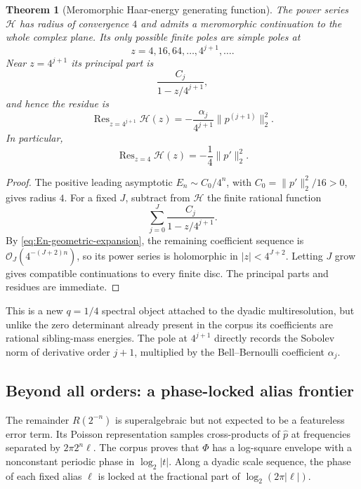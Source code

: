 \documentclass[11pt,oneside]{article}
\newtheorem{theorem}{Theorem}[section]
\theoremstyle{definition}
\theoremstyle{remark}
\newcommand{\Res}{\operatorname{Res}}
\newcommand{\bigO}{\mathcal O}
\begin{document}
\begin{theorem}[Meromorphic Haar-energy generating function]
\label{thm:H-meromorphic}
The power series $\mathcal H$ has radius of convergence $4$ and admits a
meromorphic continuation to the whole complex plane.  Its only possible finite
poles are simple poles at
\begin{equation}\label{eq:H-poles}
 z=4,16,64,\ldots,4^{j+1},\ldots.
\end{equation}
Near $z=4^{j+1}$ its principal part is
\begin{equation}\label{eq:H-principal-part}
 \frac{C_j}{1-z/4^{j+1}},
\end{equation}
and hence the residue is
\begin{equation}\label{eq:H-residue}
 \Res_{z=4^{j+1}}\mathcal H(z)
 =-\frac{\alpha_j}{4^{j+1}}\|p^{(j+1)}\|_2^2.
\end{equation}
In particular,
\begin{equation}\label{eq:H-first-residue}
 \Res_{z=4}\mathcal H(z)=-\frac1{4}\|p'\|_2^2.
\end{equation}
\end{theorem}

\begin{proof}
The positive leading asymptotic $E_n\sim C_0/4^n$, with
$C_0=\|p'\|_2^2/16>0$, gives radius $4$.  For a fixed $J$, subtract from
$\mathcal H$ the finite rational function
\[
 \sum_{j=0}^{J}\frac{C_j}{1-z/4^{j+1}}.
\]
By \eqref{eq:En-geometric-expansion}, the remaining coefficient sequence is
$\bigO_J(4^{-(J+2)n})$, so its power series is holomorphic in
$|z|<4^{J+2}$.  Letting $J$ grow gives compatible continuations to every finite
disc.  The principal parts and residues are immediate.
\end{proof}

This is a new $q=1/4$ spectral object attached to the dyadic
multiresolution, but unlike the zero determinant already present in the corpus
its coefficients are rational sibling-mass energies.  The pole at $4^{j+1}$
directly records the Sobolev norm of derivative order $j+1$, multiplied by the
Bell--Bernoulli coefficient $\alpha_j$.

\subsection{Beyond all orders: a phase-locked alias frontier}

The remainder $R(2^{-n})$ is superalgebraic but not expected to be a featureless
error term.  Its Poisson representation samples cross-products of
$\widehat p$ at frequencies separated by $2\pi2^n\ell$.  The corpus proves that
$\Phi$ has a log-square envelope with a nonconstant periodic phase in
$\log_2|t|$.  Along a dyadic scale sequence, the phase of each fixed alias
$\ell$ is locked at the fractional part of $\log_2(2\pi|\ell|)$.
\end{document}
